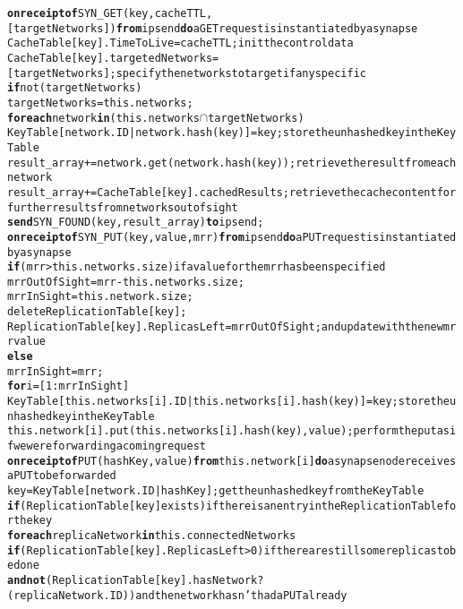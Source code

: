 \begin{figure*}[!t]
{\scriptsize
\begin{alltt}
\AL \textbf{on receipt of} SYN_GET(key,cacheTTL,[targetNetworks]) \textbf{from} ipsend \textbf{do}\hfill{\rm a GET request is instantiated by a synapse}
\AL CacheTable[key].TimeToLive = cacheTTL; \hfill{\rm init the control data}
\AL CacheTable[key].targetedNetworks = [targetNetworks];\hfill{\rm specify the networks to target if any specific}  
\AL \textbf{if} not (targetNetworks) \hfill{}
\AL  targetNetworks = this.networks; \hfill{}
\AL \textbf{for each} network \textbf{in} (this.networks \(\cap\) targetNetworks) \hfill{}
\AL  KeyTable[network.ID|network.hash(key)] = key; \hfill{\rm store the unhashed key in the KeyTable}  
\AL  result_array += network.get(network.hash(key)); \hfill{\rm retrieve the result from each network}
\AL  result_array += CacheTable[key].cachedResults; \hfill{\rm retrieve the cache content for further results from networks out of sight}
\AL  \textbf{send} SYN_FOUND(key,result_array) \textbf{to} ipsend;
\NA
\AL \textbf{on receipt of} SYN_PUT(key,value,mrr) \textbf{from} ipsend \textbf{do}\hfill{\rm a PUT request is instantiated by a synapse}
\AL \textbf{if} (mrr > this.networks.size) \hfill{\rm if a value for the mrr has been specified}
\AL   mrrOutOfSight = mrr-this.networks.size;
\AL   mrrInSight = this.network.size;
\AL   delete ReplicationTable[key];
\AL   ReplicationTable[key].ReplicasLeft = mrrOutOfSight; \hfill{\rm and update with the new mrr value}
\AL \textbf{else}
\AL   mrrInSight = mrr;
\AL \textbf{for} i = [1:mrrInSight]
\AL   KeyTable[this.networks[i].ID|this.networks[i].hash(key)] = key; \hfill{\rm store the unhashed key in the KeyTable}
\AL   this.network[i].put(this.networks[i].hash(key),value);\hfill{\rm perform the put as if we were forwarding a coming request}
\NA
\AL \textbf{on receipt of} PUT(hashKey,value) \textbf{from} this.network[i] \textbf{do}\hfill{\rm a synapse node receives a PUT to be forwarded}
\AL key = KeyTable[network.ID|hashKey]; \hfill{\rm get the unhashed key from the Key Table}
\AL \textbf{if} (ReplicationTable[key] exists) \hfill{\rm if there is an entry in the Replication Table for the key}
\AL  \textbf{for each} replicaNetwork \textbf{in} this.connectedNetworks
\AL   \textbf{if} (ReplicationTable[key].ReplicasLeft > 0)  \hfill{\rm if there are still some replicas to be done}
\AL    \textbf{and not}  (ReplicationTable[key].hasNetwork?(replicaNetwork.ID)) \hfill{\rm and the network hasn't had a PUT already}

\end{alltt}}
\end{figure*}
